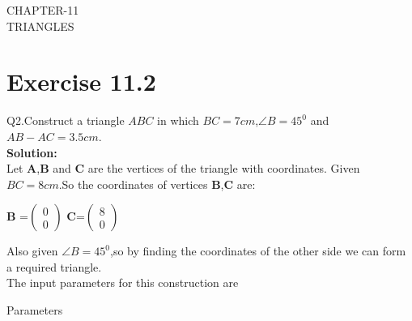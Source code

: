 \documentclass{article}
\let\vec\mathbf
\begin{document}
\begin{center}
        \textbf\large{CHAPTER-11 \\ TRIANGLES}
\end{center}
\section{Exercise 11.2}
Q2.Construct a triangle $ABC$ in which $BC=7cm$,$\angle{B}=45^0$ and $AB-AC=3.5cm$. \\
\textbf{Solution:}\\
Let $\vec{A}$,$\vec{B}$ and $\vec{C}$ are the vertices of the triangle with coordinates.
Given $BC=8cm$.So the coordinates of vertices $\vec{B}$,$\vec{C}$ are:
\begin{center}
{
$\vec{B}$ =$\begin{pmatrix}
0 \\
0 
\end{pmatrix}$ 
\vspace{1mm}
$\vec{C}$=$\begin{pmatrix}
8 \\
0
\end{pmatrix}$ 
\vspace{1mm}
}
\end{center}
Also given $\angle{B}=45^0$,so by finding the coordinates of the other side we can form a required triangle. \\
 \vspace{2mm}
 The input parameters for this construction are
 \begin{table}[h]
	  \centering
	  
	  \caption{Parameters}
	  \label{tab:Table1}
\end{table}
\end{document}
